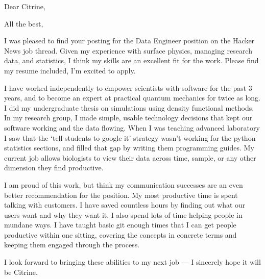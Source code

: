 \documentclass[11pt,a4paper,sans]{moderncv}        %
\begin{document}
\recipient{~}{~}
\date{\today}
\opening{Dear Citrine,}
\closing{All the best,}
\makelettertitle%

I was pleased to find your posting for the Data Engineer position on the Hacker News job thread.
Given my experience with surface physics, managing research data, and statistics, I think my skills are an excellent fit for the work.
Please find my resume included, I'm excited to apply.

I have worked independently to empower scientists with software for the past 3 years, and to become an expert at practical quantum mechanics for twice as long.
I did my undergraduate thesis on simulations using density functional methods.
In my research group, I made simple, usable technology decisions that kept our software working and the data flowing.
When I was teaching advanced laboratory I saw that the `tell students to google it' strategy wasn't working for the python statistics sections, and filled that gap by writing them programming guides.
My current job allows biologists to view their data across time, sample, or any other dimension they find productive.

I am proud of this work, but think my communication successes are an even better recommendation for the position.
My most productive time is spent talking with customers.
I have saved countless hours by finding out what our users want and why they want it.
I also spend lots of time helping people in mundane ways.
I have taught basic git enough times that I can get people productive within one sitting, covering the concepts in concrete terms and keeping them engaged through the process.

I look forward to bringing these abilities to my next job --- I sincerely hope it will be Citrine.

\makeletterclosing%
\end{document}
